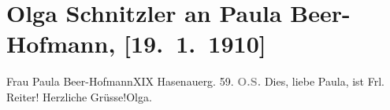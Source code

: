 

         
         \renewcommand{\erwaehntePersonen}{Personen: Paula Beer-Hofmann, Anna Reiter, Olga Schnitzler}
         \renewcommand{\erwaehnteOrte}{Orte: Hasenauerstraße, Wien}
         \renewcommand{\erwaehnteWerke}{}
               \section[Olga Schnitzler an Paula Beer-Hofmann, {[}19. 1. 1910{]}]{ Olga Schnitzler an Paula Beer-Hofmann, {[}19. 1. 1910{]}}\nopagebreak{}\rehead{ }\begin{ledgroupsized}[t]{13cm}\normalsize\beginnumbering \toendnotes[C]{\smallbreak\pagebreak[2]} 
\pstart{}{\pb}Frau Paula Beer-Hofmann\pend{}\pstart{}XIX Hasenauerg. 59.\pend{}{\bigskip}\pstart
           \noindent{}{\pb}\textcolor{gray}{\textbf{O.S.}}\pend
           \pstart
           Dies, liebe Paula, ist Frl. Reiter!\pend
           \pstart Herzliche Grüsse!\spacefill\mbox{Olga.}\pend{}
         
         \endnumbering{}\end{ledgroupsized}  \newcommand{\dateiname}{L02561}\newcommand{\titel}{Olga Schnitzler an Paula Beer-Hofmann, [19. 1. 1910]}\newcommand{\editorInnen}{Martin Anton Müller und Gerd-Hermann Susen}
      